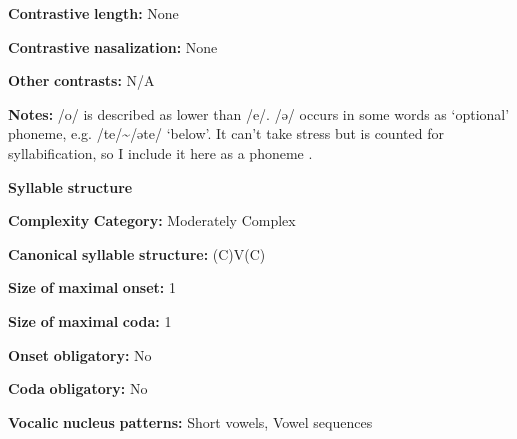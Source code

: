 \documentclass[output=paper]{langsci/langscibook}
\begin{document}
\begin{styleBody}
\textbf{Contrastive} \textbf{length:} None
\end{styleBody}

\begin{styleBody}
\textbf{Contrastive} \textbf{nasalization:} None
\end{styleBody}

\begin{styleBody}
\textbf{Other} \textbf{contrasts:} N/A
\end{styleBody}

\begin{styleBody}
\textbf{Notes:} /o/ is described as lower than /e/. /ə/ occurs in some words as ‘optional’ phoneme, e.g. /te/{\textasciitilde}/əte/ ‘below’. It can’t take stress but is counted for syllabification, so I include it here as a phoneme \citep[15-18]{Dol2007}.
\end{styleBody}

\begin{styleBody}
\textbf{Syllable} \textbf{structure}
\end{styleBody}

\begin{styleBody}
\textbf{Complexity} \textbf{Category:} Moderately Complex
\end{styleBody}

\begin{styleBody}
\textbf{Canonical} \textbf{syllable} \textbf{structure:} (C)V(C) \citep[34-8]{Dol2007}
\end{styleBody}

\begin{styleBody}
\textbf{Size} \textbf{of} \textbf{maximal} \textbf{onset:} 1
\end{styleBody}

\begin{styleBody}
\textbf{Size} \textbf{of} \textbf{maximal} \textbf{coda:} 1
\end{styleBody}

\begin{styleBody}
\textbf{Onset} \textbf{obligatory:} No
\end{styleBody}

\begin{styleBody}
\textbf{Coda} \textbf{obligatory:} No
\end{styleBody}

\begin{styleBody}
\textbf{Vocalic} \textbf{nucleus} \textbf{patterns:} Short vowels, Vowel sequences
\end{styleBody}
\end{document}
